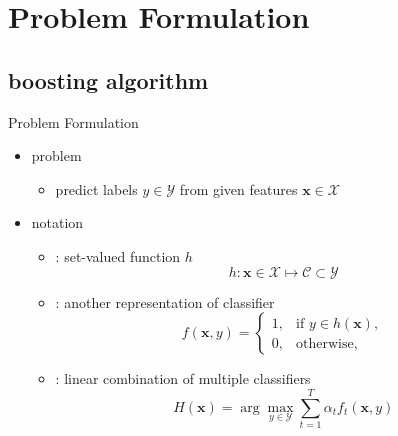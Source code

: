 \documentclass[fleqn,aspectratio=1610]{beamer}
\begin{document}
\section{Problem Formulation}
\label{sec:org759ca34}
\subsection{boosting algorithm}
\label{sec:org92ac0ac}
\begin{frame}[label={sec:orgc688c39}]{Problem Formulation}
\begin{itemize}
\item problem
\begin{itemize}
\item predict labels \(y\in\mathcal{Y}\) from given features
\(\boldsymbol{x}\in\mathcal{X}\)
\end{itemize}
\item notation
\begin{itemize}
\item {}:
set-valued function \(h\)
\begin{equation}
  h: \boldsymbol{x}\in\mathcal{X}\mapsto\mathcal{C}\subset\mathcal{Y}
\end{equation}
\item {}:
another representation of classifier
\begin{equation}
  f(\boldsymbol{x},y)
  =
  \begin{cases}
    1,& \text{if } y\in h(\boldsymbol{x}),\\
    0,& \text{otherwise},
  \end{cases}
\end{equation}
\item {}: 
linear combination of multiple classifiers
\begin{equation}
  H(\boldsymbol{x})=\arg\max_{y\in\mathcal{Y}}%
  \sum_{t=1}^{T}\alpha_t f_t(\boldsymbol{x},y)
\end{equation}
\end{itemize}
\end{itemize}
\end{frame}
\end{document}
